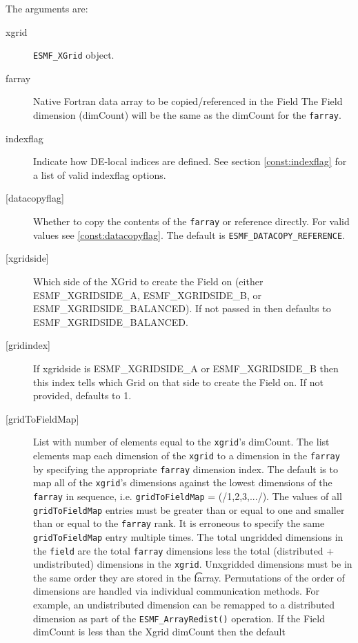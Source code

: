    The arguments are: 
   \begin{description} 
   \item [xgrid] 
   {\tt ESMF\_XGrid} object. 
   \item [farray] 
   Native Fortran data array to be copied/referenced in the Field 
   The Field dimension (dimCount) will be the same as the dimCount 
   for the {\tt farray}. 
   \item[indexflag] 
   Indicate how DE-local indices are defined. See section 
   \ref{const:indexflag} for a list of valid indexflag options. 
   \item [{[datacopyflag]}] 
   Whether to copy the contents of the {\tt farray} or reference directly. 
   For valid values see \ref{const:datacopyflag}. The default is 
   {\tt ESMF\_DATACOPY\_REFERENCE}. 
   \item [{[xgridside]}] 
   Which side of the XGrid to create the Field on (either ESMF\_XGRIDSIDE\_A, 
   ESMF\_XGRIDSIDE\_B, or ESMF\_XGRIDSIDE\_BALANCED). If not passed in then 
   defaults to ESMF\_XGRIDSIDE\_BALANCED. 
   \item [{[gridindex]}] 
   If xgridside is ESMF\_XGRIDSIDE\_A or ESMF\_XGRIDSIDE\_B then this index tells which Grid on 
   that side to create the Field on. If not provided, defaults to 1. 
   \item [{[gridToFieldMap]}] 
   List with number of elements equal to the 
   {\tt xgrid}'s dimCount. The list elements map each dimension 
   of the {\tt xgrid} to a dimension in the {\tt farray} by 
   specifying the appropriate {\tt farray} dimension index. The default is to 
   map all of the {\tt xgrid}'s dimensions against the lowest dimensions of 
   the {\tt farray} in sequence, i.e. {\tt gridToFieldMap} = (/1,2,3,.../). 
   The values of all {\tt gridToFieldMap} entries must be greater than or equal 
   to one and smaller than or equal to the {\tt farray} rank. 
   It is erroneous to specify the same {\tt gridToFieldMap} entry 
   multiple times. The total ungridded dimensions in the {\tt field} 
   are the total {\tt farray} dimensions less 
   the total (distributed + undistributed) dimensions in 
   the {\tt xgrid}. Unxgridded dimensions must be in the same order they are 
   stored in the {\t farray}. Permutations of the order of 
   dimensions are handled via individual communication methods. For example, 
   an undistributed dimension can be remapped to a distributed dimension 
   as part of the {\tt ESMF\_ArrayRedist()} operation. 
   If the Field dimCount is less than the Xgrid dimCount then the default 

\end{description}
